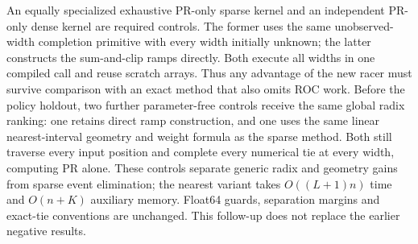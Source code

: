 An equally specialized exhaustive PR-only sparse kernel and an independent
PR-only dense kernel are required controls. The former uses the same
unobserved-width completion primitive with every width initially unknown;
the latter constructs the sum-and-clip ramps directly. Both execute all
widths in one compiled call and reuse scratch arrays. Thus any advantage of
the new racer must survive comparison with an exact method that also omits
ROC work. Before the policy holdout, two further parameter-free controls
receive the same global radix ranking: one retains direct ramp construction,
and one uses the same linear nearest-interval geometry and weight formula
as the sparse method. Both still traverse every input position and complete
every numerical tie at every width, computing PR alone. These controls
separate generic radix and geometry gains from sparse event elimination;
the nearest variant takes $O((L+1)n)$ time and $O(n+K)$ auxiliary memory.
Float64 guards, separation margins and exact-tie conventions are
unchanged. This follow-up does not replace the earlier negative results.
